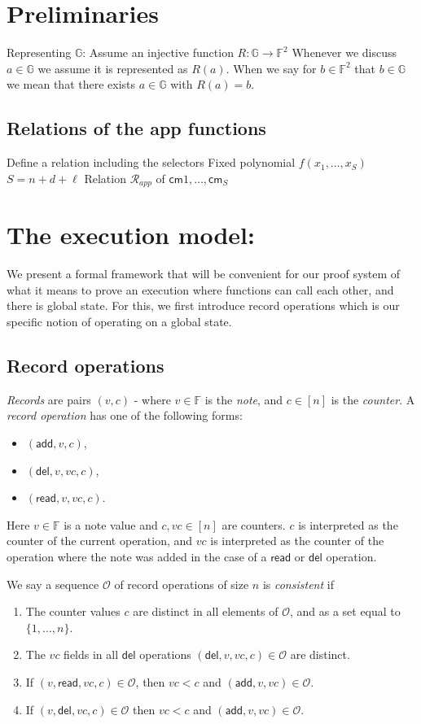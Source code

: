\documentclass[11pt]{article} %
\newcommand{\G}{\ensuremath{{\mathbb G}}\xspace}
\newcommand{\F}{\ensuremath{\mathbb F}\xspace}
\newcommand{\cm}{\ensuremath{\mathsf{cm}}\xspace}
\newcommand{\rel}{\ensuremath{\mathcal{R}}\xspace}
\newcommand{\relapp}{\ensuremath{\rel_{app}}\xspace}
\newcommand{\add}{\ensuremath{\mathsf{add}}\xspace}
\newcommand{\del}{\ensuremath{\mathsf{del}}\xspace}
\renewcommand{\read}{\ensuremath{\mathsf{read}}\xspace}
\newcommand{\countrange}{\ensuremath{[n]}\xspace}
\newcommand{\ops}{\ensuremath{\mathcal{O}}\xspace}
\begin{document}
\section{Preliminaries}

Representing \G:
Assume an injective function $R:\G \to \F^2$
Whenever we discuss $a\in \G$ we assume it is represented as  $R(a)$.
When we say for $b\in \F^2$ that $b\in \G$ we mean that there exists $a\in \G$ with $R(a)=b$.
\subsection{Relations of the app functions}
Define a relation including the selectors
Fixed polynomial $f(x_1,\ldots,x_{S})$
$S=n+d+\ell$
Relation \relapp of $\cm1,\ldots,\cm_S$

\section{The execution model:}
We present a formal framework that will be convenient for our proof system of what it means to prove an execution where functions can call each other, and there is global state.
For this, we first introduce record operations which is our specific notion of operating on a global state. 
\subsection{Record operations}
\emph{Records} are pairs $(v,c)$ - where $v\in \F$ is the \emph{note}, and $c\in \countrange$ is the \emph{counter}.
A \emph{record operation} has one of the following forms:
\begin{itemize}
 \item $(\add,v,c)$,
\item $(\del,v,vc,c)$,
\item $(\read,v,vc,c)$.

\end{itemize}
Here $v\in \F$ is a note value and $c,vc\in \countrange$ are counters.
$c$ is interpreted as the counter of the current operation, and $vc$ is interpreted as the counter of the operation where
the note was added in the case of a \read or \del operation.



We say a sequence \ops of record operations of size $n$ is \emph{consistent} if 
\begin{enumerate}
\item The counter values $c$ are distinct in all elements of \ops, and as a set equal to $\{1,\ldots,n\}$.
\item The $vc$ fields in all $\del$ operations $(\del,v,vc,c)\in \ops$ are distinct.
\item If $(v,\read,vc,c)\in \ops$, then $vc<c$ and $(\add, v,vc)\in \ops$.
\item If $(v,\del,vc,c)\in \ops$ then $vc<c$ and $(\add,v,vc)\in \ops$.
\end{enumerate}
\end{document}
